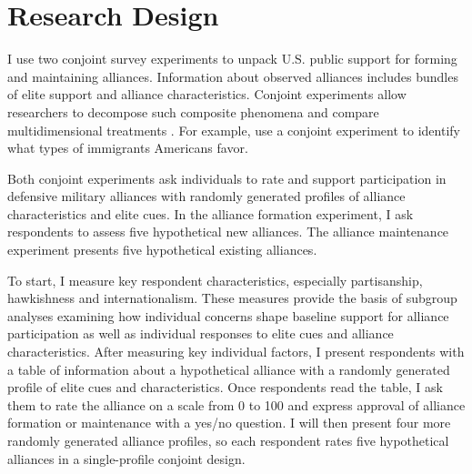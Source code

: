 \documentclass[12pt]{article}
\begin{document}
\section{Research Design}


I use two conjoint survey experiments to unpack U.S. public support for forming and maintaining alliances. 
Information about observed alliances includes bundles of elite support and alliance characteristics. 
Conjoint experiments allow researchers to decompose such composite phenomena and compare multidimensional treatments \citep{Hainmuelleretal2014}. 
For example, \citet{HainmuellerHopkins2015} use a conjoint experiment to identify what types of immigrants Americans favor. 


Both conjoint experiments ask individuals to rate and support participation in defensive military alliances with randomly generated profiles of alliance characteristics and elite cues. 
In the alliance formation experiment, I ask respondents to assess five hypothetical new alliances. 
The alliance maintenance experiment presents five hypothetical existing alliances.


To start, I measure key respondent characteristics, especially partisanship, hawkishness and internationalism.  
These measures provide the basis of subgroup analyses examining how individual concerns shape baseline support for alliance participation as well as individual responses to elite cues and alliance characteristics. 
After measuring key individual factors, I present respondents with a table of information about a hypothetical alliance with a randomly generated profile of elite cues and characteristics.
Once respondents read the table, I ask them to rate the alliance on a scale from 0 to 100 and express approval of alliance formation or maintenance with a yes/no question. 
I will then present four more randomly generated alliance profiles, so each respondent rates five hypothetical alliances in a single-profile conjoint design.%
\end{document}
